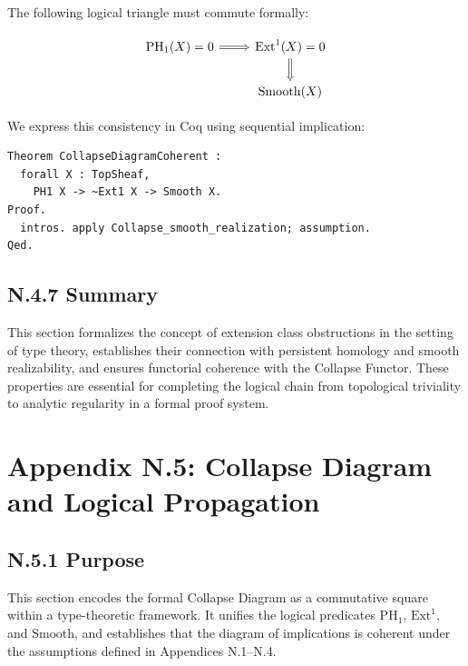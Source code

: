\documentclass[11pt]{article}
\begin{document}
The following logical triangle must commute formally:

\[
\begin{tikzcd}
\mathrm{PH}_1(X) = 0 \arrow[r, Rightarrow]
& \mathrm{Ext}^1(X) = 0 \arrow[d, Rightarrow] \\
& \mathrm{Smooth}(X)
\end{tikzcd}
\]

We express this consistency in Coq using sequential implication:

\begin{verbatim}
Theorem CollapseDiagramCoherent :
  forall X : TopSheaf,
    PH1 X -> ~Ext1 X -> Smooth X.
Proof.
  intros. apply Collapse_smooth_realization; assumption.
Qed.
\end{verbatim}

\subsection*{N.4.7 Summary}

This section formalizes the concept of extension class obstructions in the setting of type theory,  
establishes their connection with persistent homology and smooth realizability, and ensures functorial  
coherence with the Collapse Functor. These properties are essential for completing the logical chain  
from topological triviality to analytic regularity in a formal proof system.




\section*{Appendix N.5: Collapse Diagram and Logical Propagation}

\subsection*{N.5.1 Purpose}

This section encodes the formal Collapse Diagram as a commutative square within a type-theoretic framework.  
It unifies the logical predicates $\mathrm{PH}_1$, $\mathrm{Ext}^1$, and $\mathrm{Smooth}$, and establishes  
that the diagram of implications is coherent under the assumptions defined in Appendices N.1–N.4.
\end{document}
